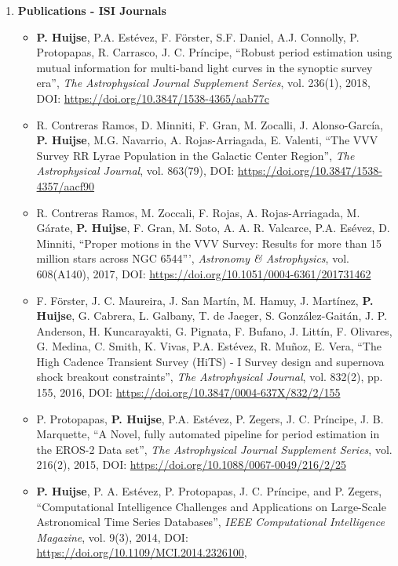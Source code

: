 \documentclass[letterpaper,11pt]{article}
\newcommand{\compactlist}{\setlength{\parskip}{0pt} \setlength{\leftskip}{2em}}
\begin{document}
\begin{enumerate}[I]
	
	
	\item \textbf{Publications - ISI Journals}

	\begin{itemize}  \compactlist{}
        \item \textbf{P. Huijse}, P.A. Est\'evez, F. F\"orster, S.F. Daniel, A.J. Connolly, P. Protopapas, R. Carrasco, J. C. Pr\'incipe, ``Robust period estimation using mutual information for multi-band light curves in the synoptic survey era'', \emph{The Astrophysical Journal Supplement Series}, vol. 236(1), 2018, DOI: \url{https://doi.org/10.3847/1538-4365/aab77c}
        \item R. Contreras Ramos, D. Minniti, F. Gran, M. Zocalli, J. Alonso-Garc\'ia, \textbf{P. Huijse}, M.G. Navarrio, A. Rojas-Arriagada, E. Valenti, ``The VVV Survey RR Lyrae Population in the Galactic Center Region'', \emph{The Astrophysical Journal}, vol. 863(79), DOI: \url{https://doi.org/10.3847/1538-4357/aacf90}
        \item  R. Contreras Ramos, M. Zoccali, F. Rojas, A. Rojas-Arriagada, M. G\'arate, \textbf{P. Huijse}, F. Gran, M. Soto, A. A. R. Valcarce, P.A. Es\'evez, D. Minniti, ``Proper motions in the VVV Survey: Results for more than 15 million stars across NGC 6544''', \emph{Astronomy \& Astrophysics}, vol. 608(A140), 2017, DOI: \url{https://doi.org/10.1051/0004-6361/201731462}
        \item F. F\"orster, J. C. Maureira, J. San Mart\'in, M. Hamuy, J. Mart\'inez, \textbf{P. Huijse}, G. Cabrera, L. Galbany, T. de Jaeger, S. González-Gait\'an, J. P. Anderson, H. Kuncarayakti, G. Pignata, F. Bufano, J. Litt\'in, F. Olivares, G. Medina, C. Smith, K. Vivas, P.A. Est\'evez, R. Muñoz, E. Vera, ``The High Cadence Transient Survey (HiTS) - I Survey design and supernova shock breakout constraints'', \emph{The Astrophysical Journal}, vol. 832(2), pp. 155, 2016, DOI: \url{https://doi.org/10.3847/0004-637X/832/2/155}
        \item P. Protopapas, \textbf{P. Huijse}, P.A. Estévez, P. Zegers, J. C. Príncipe, J. B. Marquette, ``A Novel, fully automated pipeline for period estimation in the {EROS}-2 Data set'', \emph{The Astrophysical Journal Supplement Series}, vol. 216(2), 2015, DOI: \url{https://doi.org/10.1088/0067-0049/216/2/25}
        \item \textbf{P. Huijse}, P. A. Estévez, P. Protopapas, J. C. Príncipe, and P. Zegers, ``Computational Intelligence Challenges and Applications on Large-Scale Astronomical Time Series Databases'', \emph{IEEE Computational Intelligence Magazine}, vol. 9(3), 2014, DOI: \url{https://doi.org/10.1109/MCI.2014.2326100}, \href{https://arxiv.org/pdf/1509.07823.pdf}{\faExternalLink}

\end{itemize}
\end{enumerate}
\end{document}
